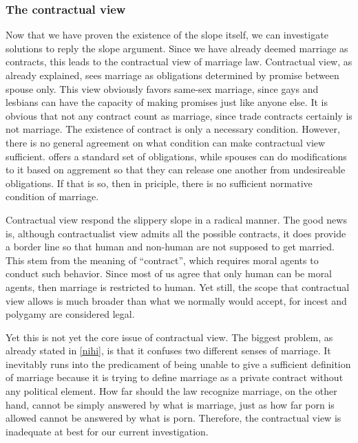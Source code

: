 \documentclass{article}
\begin{document}
\subsubsection{The contractual view}

Now that we have proven the existence of the slope itself, we can investigate solutions to reply the slope argument. Since we have already deemed marriage as contracts, this leads to the contractual view of marriage law. Contractual view, as already explained, sees marriage as obligations determined by promise between spouse only. \autocite{brakeMarriageDomesticPartnership2023} This view obviously favors same-sex marriage, since gays and lesbians can have the capacity of making promises just like anyone else. It is obvious that not any contract count as marriage, since trade contracts certainly is not marriage. The existence of contract is only a necessary condition. However, there is no general agreement on what condition can make contractual view sufficient.\autocite{morseWhyUnilateralDivorce2006,houlgateChildrenRightsState2005} \textcite{wasserstromAdulteryImmoral1974} offers a standard set of obligations, while spouses can do modifications to it based on aggrement so that they can release one another from undesireable obligations. If that is so, then in priciple, there is no sufficient normative condition of marriage. 

Contractual view respond the slippery slope in a radical manner. The good news is, although contractualist view admits all the possible contracts, it does provide a border line so that human and non-human are not supposed to get married. This stem from the meaning of ``contract'', which requires moral agents to conduct such behavior. Since most of us agree that only human can be moral agents, then marriage is restricted to human. Yet still, the scope that contractual view allows is much broader than what we normally would accept, for incest and polygamy are considered legal. 

Yet this is not yet the core issue of contractual view. The biggest problem, as already stated in \ref{nihi}, is that it confuses two different senses of marriage. It inevitably runs into the predicament of being unable to give a sufficient definition of marriage because it is trying to define marriage as a private contract without any political element. How far should the law recognize marriage, on the other hand, cannot be simply answered by what is marriage, just as how far porn is allowed cannot be answered by what is porn. Therefore, the contractual view is inadequate at best for our current investigation.
\end{document}
